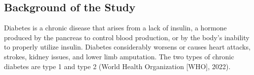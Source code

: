 \subsection*{Background of the Study}
Diabetes is a chronic disease that arises from a lack of insulin, a hormone
produced by the pancreas to control blood production, or by the body's inability
to properly utilize insulin. Diabetes considerably worsens or causes heart
attacks, strokes, kidney issues, and lower limb amputation. The two types of
chronic diabetes are type 1 and type 2 (World Health Organization [WHO], 2022).
